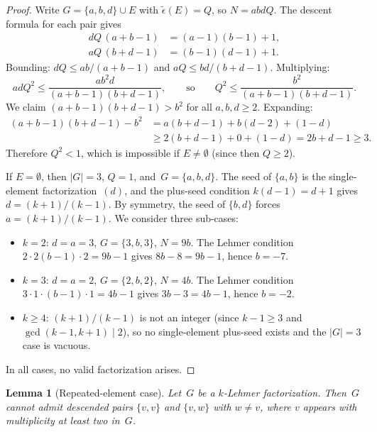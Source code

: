 \documentclass[11pt]{article}
\newtheorem{lemma}[theorem]{Lemma}
\theoremstyle{definition}
\theoremstyle{remark}
\newcommand{\eps}{\tilde{\epsilon}}
\begin{document}
\begin{proof}
Write $G = \{a, b, d\} \cup E$ with $\eps(E) = Q$, so $N = abdQ$.  The
descent formula for each pair gives
\begin{align}
  \label{eq:ov-I}
  dQ\,(a+b-1) &= (a\!-\!1)(b\!-\!1)+1, \\
  \label{eq:ov-II}
  aQ\,(b+d-1) &= (b\!-\!1)(d\!-\!1)+1.
\end{align}
Bounding: $dQ \le ab/(a+b-1)$ and $aQ \le bd/(b+d-1)$.  Multiplying:
\[
  adQ^2 \le \frac{ab^2d}{(a+b-1)(b+d-1)},
  \qquad\text{so}\qquad
  Q^2 \le \frac{b^2}{(a+b-1)(b+d-1)}.
\]
We claim $(a+b-1)(b+d-1) > b^2$ for all $a,b,d \ge 2$.  Expanding:
\begin{align*}
  (a+b-1)(b+d-1) - b^2
    &= a(b+d-1) + b(d-2) + (1-d) \\
    &\ge 2(b+d-1) + 0 + (1-d)
    = 2b+d-1
    \ge 3.
\end{align*}
Therefore $Q^2 < 1$, which is impossible if $E \ne \emptyset$ (since then
$Q \ge 2$).

If $E = \emptyset$, then $|G| = 3$, $Q = 1$, and~$G = \{a,b,d\}$.  The
seed of $\{a,b\}$ is the single-element factorization~$(d)$, and the
plus-seed condition $k(d-1) = d + 1$ gives $d = (k+1)/(k-1)$.  By
symmetry, the seed of $\{b,d\}$ forces $a = (k+1)/(k-1)$.  We consider
three sub-cases:
\begin{itemize}
  \item $k = 2$: $d = a = 3$, $G = \{3, b, 3\}$, $N = 9b$.  The Lehmer
    condition $2 \cdot 2(b-1) \cdot 2 = 9b - 1$ gives $8b - 8 = 9b - 1$,
    hence $b = -7$.
  \item $k = 3$: $d = a = 2$, $G = \{2, b, 2\}$, $N = 4b$.  The Lehmer
    condition $3 \cdot 1 \cdot (b-1) \cdot 1 = 4b - 1$ gives
    $3b - 3 = 4b - 1$, hence $b = -2$.
  \item $k \ge 4$: $(k+1)/(k-1)$ is not an integer (since $k - 1 \ge 3$
    and $\gcd(k-1, k+1) \mid 2$), so no single-element plus-seed exists
    and the $|G| = 3$ case is vacuous.
\end{itemize}
In all cases, no valid factorization arises.
\end{proof}


\begin{lemma}[Repeated-element case]\label{lem:repeated}
Let~$G$ be a $k$-Lehmer factorization.  Then~$G$ cannot admit descended
pairs $\{v,v\}$ and $\{v,w\}$ with $w \ne v$, where $v$ appears with
multiplicity at least two in~$G$.
\end{lemma}
\end{document}
